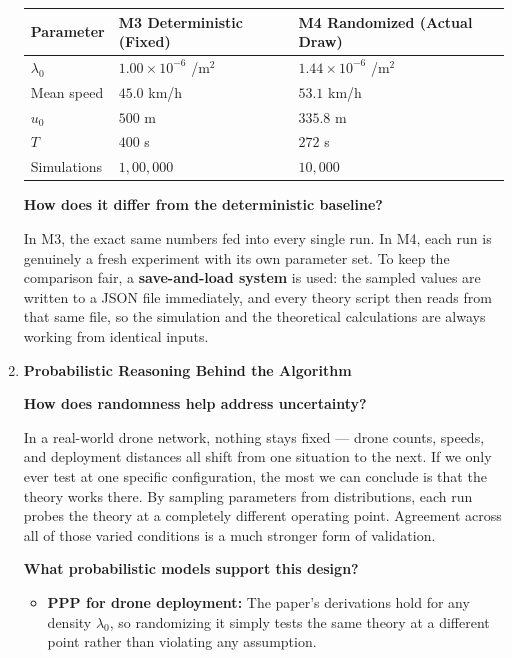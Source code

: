 \documentclass[11pt]{article}
\newcommand{\subquestion}[1]{
    \vspace{0.3cm}
    \noindent\textbf{#1}
    \vspace{0.1cm}
}
\begin{document}
\begin{enumerate}[label=\textbf{Scribe Question \arabic*:}, leftmargin=*, itemsep=1.5em]
\vspace{0.3cm}
\begin{center}
\begin{tabular}{lll}
    \toprule
    \textbf{Parameter} & \textbf{M3 Deterministic (Fixed)} & \textbf{M4 Randomized (Actual Draw)} \\
    \midrule
    $\lambda_0$ & $1.00 \times 10^{-6}$ /m$^2$ & $1.44 \times 10^{-6}$ /m$^2$ \\
    Mean speed   & $45.0$ km/h & $53.1$ km/h \\
    $u_0$        & $500$ m & $335.8$ m \\
    $T$          & $400$ s & $272$ s \\
    Simulations  & $1{,}00{,}000$ & $10{,}000$ \\
    \bottomrule
\end{tabular}
\end{center}
\vspace{0.3cm}

\subquestion{How does it differ from the deterministic baseline?}

In M3, the exact same numbers fed into every single run. In M4, each run is genuinely a fresh
experiment with its own parameter set. To keep the comparison fair, a \textbf{save-and-load system}
is used: the sampled values are written to a JSON file immediately, and every theory script then reads
from that same file, so the simulation and the theoretical calculations are always working from
identical inputs.

\newpage
\item \textbf{Probabilistic Reasoning Behind the Algorithm}

\subquestion{How does randomness help address uncertainty?}

In a real-world drone network, nothing stays fixed --- drone counts, speeds, and deployment distances
all shift from one situation to the next. If we only ever test at one specific configuration, the most we
can conclude is that the theory works there. By sampling parameters from distributions, each run
probes the theory at a completely different operating point. Agreement across all of those varied
conditions is a much stronger form of validation.

\subquestion{What probabilistic models support this design?}

\begin{itemize}[leftmargin=*, itemsep=0.3em]
    \item \textbf{PPP for drone deployment:} The paper's derivations hold for any density $\lambda_0$,
          so randomizing it simply tests the same theory at a different point rather than violating
          any assumption.


\end{itemize}
\end{enumerate}
\end{document}
